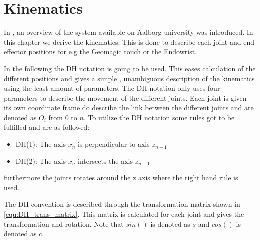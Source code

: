 \chapter{Kinematics}\label{cha:kinematic}

In , an overview of the system available on Aalborg university was introduced. In this chapter we derive the kinematics. This is done to describe each joint and end effector positions for e.g the Geomagic touch or the Endowrist. 

In the following the \gls{DH} notation is going to be used. This eases calculation of the different positions and gives a simple , unambiguous description of the kinematics using the least amount of parameters. The \gls{DH} notation only uses four parameters to describe the movement of the different joints. Each joint is given its own coordinate frame do describe the link between the different joints and are denoted as $O_i$ from 0 to $n$. To utilize the \gls{DH} notation some rules got to be fulfilled and are as followed:

\begin{itemize}
\item DH(1): The axis $x_n$ is perpendicular to axis $z_{n-1}$
\item DH(2): The axis $x_n$ intersects the axis $z_{n-1}$
\end{itemize}

furthermore the joints rotates around the z axis where the right hand rule is used.

The \gls{DH} convention is described through the transformation matrix shown in \eqref{equ:DH_trans_matrix}. This matrix is calculated for each joint and gives the transformation and rotation. Note that $sin()$ is denoted as $s$ and $cos()$ is denoted as $c$.

